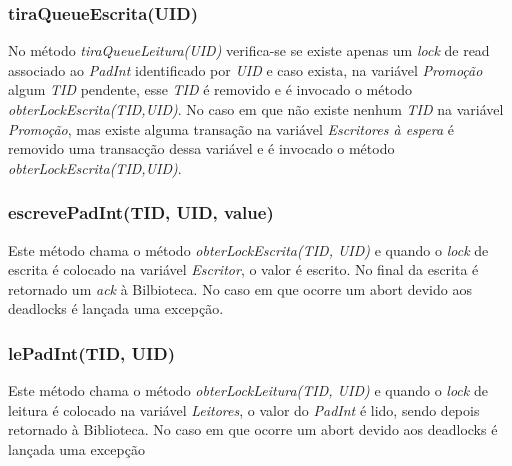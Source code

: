 \subsubsection{tiraQueueEscrita(UID)}

No método \textit{tiraQueueLeitura(UID)} verifica-se se existe apenas um \textit{lock} de read associado ao \textit{PadInt} identificado por \textit{UID} e caso exista, na variável \textit{Promoção} algum \textit{TID} pendente, esse \textit{TID} é removido e é invocado o método \textit{obterLockEscrita(TID,UID)}. No caso em que não existe nenhum \textit{TID} na variável \textit{Promoção}, mas existe alguma transação na variável \textit{Escritores à espera} é removido uma transacção dessa variável e é invocado o método \textit{obterLockEscrita(TID,UID)}.

\subsubsection{escrevePadInt(TID, UID, value)}

Este método chama o método \textit{obterLockEscrita(TID, UID)} e quando o \textit{lock} de escrita é colocado na variável \textit{Escritor}, o valor é escrito. No final da escrita é retornado um \textit{ack} à Bilbioteca. No caso em que ocorre um abort devido aos deadlocks é lançada uma excepção.

\subsubsection{lePadInt(TID, UID)}

Este método chama o método \textit{obterLockLeitura(TID, UID)} e quando o \textit{lock} de leitura é colocado na variável \textit{Leitores}, o valor do \textit{PadInt} é lido, sendo depois retornado à Biblioteca. No caso em que ocorre um abort devido aos deadlocks é lançada uma excepção